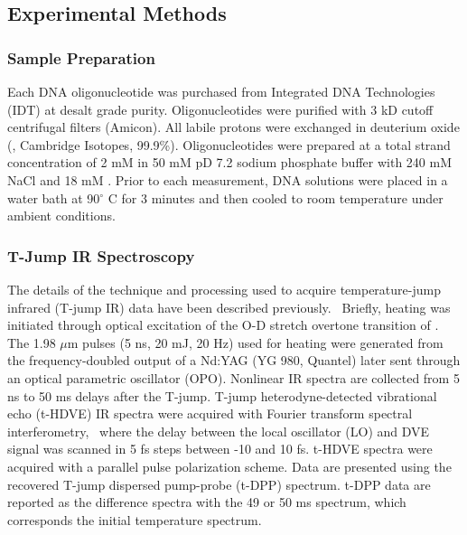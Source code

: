 \documentclass[journal=jpcbfk,manuscript=article]{achemso}
\begin{document}

\subsection{Experimental Methods}

\subsubsection{Sample Preparation}

Each DNA oligonucleotide was purchased from Integrated DNA Technologies (IDT) at desalt grade purity. Oligonucleotides were purified with 3 kD cutoff centrifugal filters (Amicon). All labile protons were exchanged in deuterium oxide (, Cambridge Isotopes, 99.9\%). Oligonucleotides were prepared at a total strand concentration of 2 mM in 50 mM pD 7.2 sodium phosphate buffer with 240 mM NaCl and 18 mM . Prior to each measurement, DNA solutions were placed in a water bath at 90$^{\circ}$ C for 3 minutes and then cooled to room temperature under ambient conditions.

\subsubsection{T-Jump IR Spectroscopy}\label{sec:Tjump}

The details of the technique and processing used to acquire temperature-jump infrared (T-jump IR) data have been described previously.~\citep{Chung2007TransientKinetics,Jones2009Heterodyne-detectedSpectroscopy,Jones2012TransientInfrared} Briefly, heating was initiated through optical excitation of the O-D stretch overtone transition of . The 1.98 $\mu$m pulses (5 ns, 20 mJ, 20 Hz) used for heating were generated from the frequency-doubled output of a Nd:YAG (YG 980, Quantel) later sent through an optical parametric oscillator (OPO). Nonlinear IR spectra are collected from 5 ns to 50 ms delays after the T-jump. T-jump heterodyne-detected vibrational echo (t-HDVE) IR spectra were acquired with Fourier transform spectral interferometry,~\citep{Jones2009Heterodyne-detectedSpectroscopy} where the delay between the local oscillator (LO) and DVE signal was scanned in 5 fs steps between -10 and 10 fs. t-HDVE spectra were acquired with a parallel pulse polarization scheme. Data are presented using the recovered T-jump dispersed pump-probe (t-DPP) spectrum. t-DPP data are reported as the difference spectra with the 49 or 50 ms spectrum, which corresponds the initial temperature spectrum. 
\end{document}
